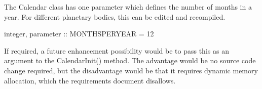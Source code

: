 
The Calendar class has one parameter which defines the number of months
in a year.  For different planetary bodies, this can be edited and
recompiled.

        integer, parameter :: MONTHSPERYEAR = 12

If required, a future enhancement possibility would be to pass this as an
argument to the CalendarInit() method.  The advantage would be no source
code change required, but the disadvantage would be that it requires
dynamic memory allocation, which the requirements document disallows.
